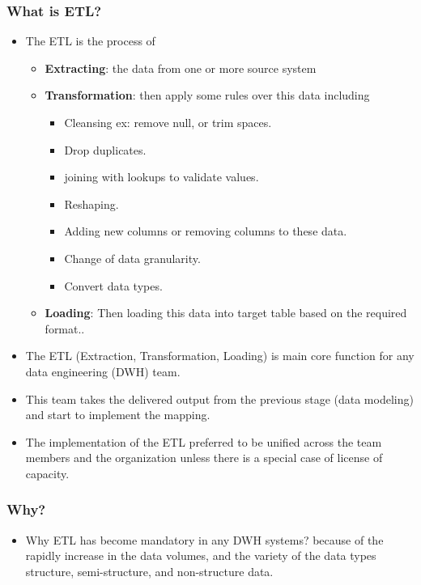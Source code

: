 \begin{frame}
    \frametitle{What is ETL?}

    \begin{itemize}[<+->]
        \item The ETL is the process of
        \begin{itemize}[<+->]
            \item  \textbf{Extracting}: the data from one or more source system
            \item  \textbf{Transformation}: then apply some rules over this data including
            \begin{itemize}[<+->]
                \item Cleansing ex: remove null, or trim spaces.
                \item Drop duplicates.
                \item joining with lookups to validate values.
                \item Reshaping.
                \item Adding new columns or removing columns to these data.
                \item Change of data granularity.
                \item Convert data types.
            \end{itemize}
            \item \textbf{Loading}: Then loading this data into target table based on the required format..
        \end{itemize}
        \item The ETL (Extraction, Transformation, Loading) is main core function for any data engineering (DWH) team.
        \item This team takes the delivered output from the previous stage (data modeling) and start to implement the mapping.
        \item The implementation of the ETL preferred to be unified across the team members and the organization unless
        there is a special case of license of capacity.

    \end{itemize}

\end{frame}
\begin{frame}
    \frametitle{Why?}

    \begin{itemize}[<+->]
        \item Why ETL has become mandatory in any DWH systems? because of the rapidly increase in the data volumes,
        and the variety of the data types structure, semi-structure, and non-structure data.

    \end{itemize}

\end{frame}

